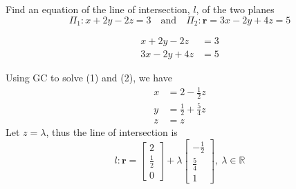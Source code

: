 \documentclass[11pt,a4paper]{book}
\newcommand{\R}{\mathbb{R}}
\begin{document}
\begin{example}

Find an equation of the line of intersection, $l$, of the two planes
\[
\Pi_{1}:x+2y-2z=3\quad\text{and}\quad\Pi_{2}:\textbf{r}=3x-2y+4z=5
\]

\Solution

\begin{align*}
x+2y-2z & =3\tag{1}\\
3x-2y+4z & =5\tag{2}
\end{align*}

Using GC to solve (1) and (2), we have
\begin{align*}
x & =2-\frac{1}{2}z\\
y & =\frac{1}{2}+\frac{5}{4}z\\
z & =z
\end{align*}
Let $z=\lambda$, thus the line of intersection is
\[
l:\textbf{r}=\begin{bmatrix}2\\
\frac{1}{2}\\
0
\end{bmatrix}+\lambda\begin{bmatrix}-\frac{1}{2}\\
\frac{5}{4}\\
1
\end{bmatrix},\:\lambda\in\R
\]

\end{example}
\end{document}

